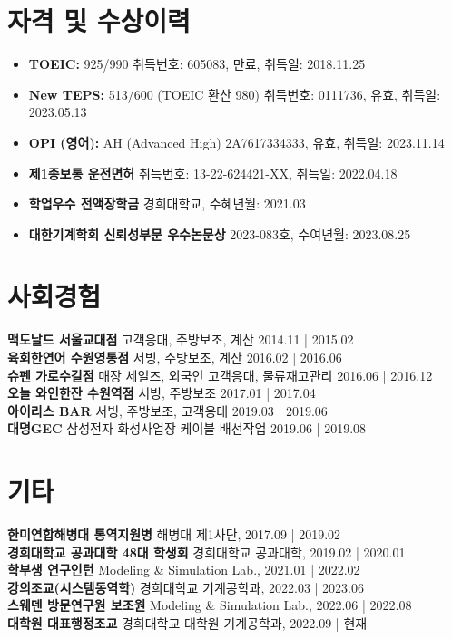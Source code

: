 \documentclass[a4paper,10pt]{extarticle}
\begin{document}
\section*{자격 및 수상이력}
\begin{itemize}
    \item \textbf{TOEIC:} 925/990 \hfill 취득번호: 605083, 만료, 취득일: 2018.11.25
    \item \textbf{New TEPS:} 513/600 (TOEIC 환산 980) \hfill 취득번호: 0111736, 유효, 취득일: 2023.05.13
    \item \textbf{OPI (영어):} AH (Advanced High) \hfill 2A7617334333, 유효, 취득일: 2023.11.14
    \item \textbf{제1종보통 운전면허} \hfill 취득번호: 13-22-624421-XX, 취득일: 2022.04.18
    \item \textbf{학업우수 전액장학금} \hfill 경희대학교, 수혜년월: 2021.03
    \item \textbf{대한기계학회 신뢰성부문 우수논문상} \hfill 2023-083호, 수여년월: 2023.08.25
\end{itemize}

\section*{사회경험}
\noindent
\textbf{맥도날드 서울교대점} 고객응대, 주방보조, 계산 \hfill 2014.11 | 2015.02\\
\textbf{육회한연어 수원영통점} 서빙, 주방보조, 계산 \hfill 2016.02 | 2016.06\\
\textbf{슈펜 가로수길점} 매장 세일즈, 외국인 고객응대, 물류재고관리 \hfill 2016.06 | 2016.12\\
\textbf{오늘 와인한잔 수원역점} 서빙, 주방보조 \hfill 2017.01 | 2017.04\\
\textbf{아이리스 BAR} 서빙, 주방보조, 고객응대 \hfill 2019.03 | 2019.06\\
\textbf{대명GEC} 삼성전자 화성사업장 케이블 배선작업 \hfill 2019.06 | 2019.08\\

\section*{기타}
\textbf{한미연합해병대 통역지원병} \hfill 해병대 제1사단, 2017.09 | 2019.02\\
\textbf{경희대학교 공과대학 48대 학생회} \hfill 경희대학교 공과대학, 2019.02 | 2020.01\\
\textbf{학부생 연구인턴} \hfill Modeling \& Simulation Lab., 2021.01 | 2022.02\\
\textbf{강의조교(시스템동역학)} \hfill 경희대학교 기계공학과, 2022.03 | 2023.06\\
\textbf{스웨덴 방문연구원 보조원} \hfill Modeling \& Simulation Lab., 2022.06 | 2022.08\\
\textbf{대학원 대표행정조교} \hfill 경희대학교 대학원 기계공학과, 2022.09 | 현재\\
\end{document}
